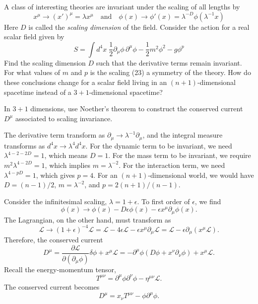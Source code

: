 A class of interesting theories are invariant under the scaling of all lengths by
\begin{equation}
    x^\mu \to (x')^\mu = \lambda x^\mu \quad \text{and} \quad \phi(x) \to \phi'(x) = \lambda^{-D}\phi(\lambda^{-1}x)
\end{equation}
Here $D$ is called the \textit{scaling dimension} of the field. Consider the action for a real scalar field given by
\begin{equation}
    S = \int d^4x\; \frac{1}{2}\partial_\mu\phi\,\partial^\mu\phi - \frac{1}{2}m^2\phi^2 - g\phi^p
\end{equation}
Find the scaling dimension $D$ such that the derivative terms remain invariant. For what values of $m$ and $p$ is the scaling (23) a symmetry of the theory. How do these conclusions change for a scalar field living in an $(n+1)$-dimensional spacetime instead of a $3+1$-dimensional spacetime?

In $3+1$ dimensions, use Noether's theorem to construct the conserved current $D^\mu$ associated to scaling invariance.
\begin{solution}
    The derivative term transform as $\partial_\mu \to \lambda^{-1}\partial_\mu$, and the integral measure transforms as $d^4x \to\lambda^4d^4x$. For the dynamic term to be invariant, we need $\lambda^{4-2-2D} = 1$, which means $D=1$. For the mass term to be invariant, we require $m^2\lambda^{4-2D} = 1$, which implies $m=\lambda^{-2}$. For the interaction term, we need $\lambda^{4-pD}=1$, which gives $p = 4$. For an $(n+1)$-dimensional world, we would have $ D = (n-1)/2$, $m = \lambda^{-2}$, and $p = 2(n+1)/(n-1)$.
    
    Consider the infinitesimal scaling, $\lambda = 1+\epsilon$. To first order of $\epsilon$, we find
    \begin{equation}
        \phi(x) \to \phi(x) -D\epsilon\phi(x) -\epsilon x^\mu \partial_\mu \phi(x).
    \end{equation}
    The Lagrangian, on the other hand, must transform as
    \begin{equation}
        \mathcal{L} \to (1+\epsilon)^{-4}\mathcal{L} = \mathcal{L} -4\epsilon\mathcal{L}-\epsilon x^\mu \partial_\mu\mathcal{L} = \mathcal{L}-\epsilon\partial_\mu(x^\mu\mathcal{L}).
    \end{equation}
    Therefore, the conserved current
    \begin{equation}
        D^\mu = \frac{\partial\mathcal{L}}{\partial(\partial_\mu\phi)}\delta\phi + x^\mu\mathcal{L} = -\partial^\mu \phi (D\phi +  x^\nu\partial_\nu \phi) + x^\mu\mathcal{L}.
    \end{equation}
    Recall the energy-momentum tensor,
    \begin{equation}
        T^{\mu\nu} = \partial^\mu\phi\partial^\nu\phi  -\eta^{\mu\nu}\mathcal{L}.
    \end{equation}
    The conserved current becomes
    \begin{equation}
        D^\mu =x_\nu T^{\mu\nu} - \phi\partial^\mu\phi.
    \end{equation}
    
\end{solution}